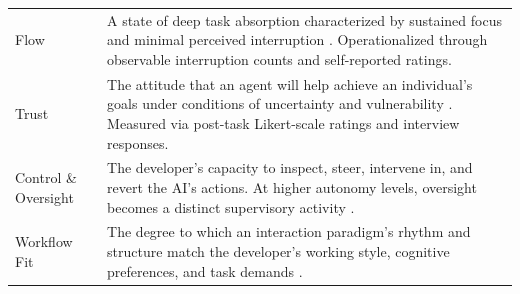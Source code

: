 \begin{table}[htbp]
{\begin{tabularx}{1\textwidth}{p{2.3cm} X}
      Flow & A state of deep task absorption characterized by sustained focus and minimal perceived interruption \parencite[pp.~71--77]{csikszentmihalyi1990flow}. Operationalized through observable interruption counts and self-reported ratings. \\

      Trust & The attitude that an agent will help achieve an individual's goals under conditions of uncertainty and vulnerability \parencite[p.~54]{leeSee2004trust}. Measured via post-task Likert-scale ratings and interview responses. \\

      Control \& Oversight & The developer's capacity to inspect, steer, intervene in, and revert the AI's actions. At higher autonomy levels, oversight becomes a distinct supervisory activity \parencite[pp.~289--291]{parasuraman2000model}. \\

      Workflow Fit & The degree to which an interaction paradigm's rhythm and structure match the developer's working style, cognitive preferences, and task demands \parencite{sarkar2025codewithme}. \\

      \bottomrule

  \end{tabularx}}

\end{table}
